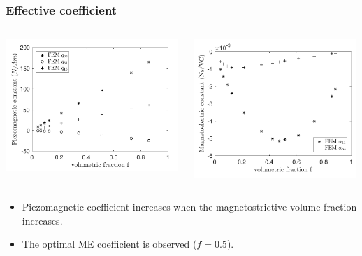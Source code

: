 \documentclass[compress]{beamer}
\begin{document}
\begin{frame}\frametitle{Effective coefficient}
\begin{columns}[totalwidth=\textwidth]
	\begin{column}{.49\textwidth}
	\centering
	\includegraphics[width=0.99\textwidth]{Graphic/04_cubematqu.pdf}
	\end{column}
	\begin{column}{.49\textwidth}
	\centering	
	\includegraphics[width=0.99\textwidth]{Graphic/04_cubematalpha.pdf}
	\end{column}
\end{columns}
\begin{exampleblock}{}
   \begin{itemize}[label=$\bullet$, font=\small, leftmargin=*]
	\item Piezomagnetic coefficient increases when the magnetostrictive volume fraction increases.
	\item The optimal ME coefficient is observed ($f=0.5$).
	\end{itemize}
	\end{exampleblock}
\end{frame}
\end{document}
